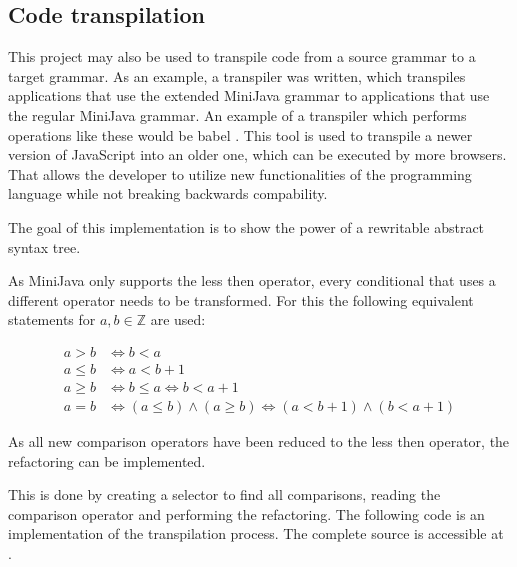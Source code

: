 
\subsection{Code transpilation}

This project may also be used to transpile code from a source grammar to a target grammar. 
As an example, a transpiler was written, which transpiles applications that use
the extended MiniJava grammar to applications that use the regular MiniJava grammar. 
An example of a transpiler which performs operations like these would be babel \cite{babeljs}. This tool is
used to transpile a newer version of JavaScript into an older one, which can be executed by more browsers. 
That allows the developer to utilize new functionalities of the programming language while not breaking backwards compability.

The goal of this implementation is to show the power of a rewritable abstract syntax tree. 

As MiniJava only supports the less then operator, every conditional that uses a different operator needs to be transformed.
For this the following equivalent statements for $a, b \in \mathbb{Z}$ are used:

\begin{align}
    a > b  &\Longleftrightarrow b < a\\
    a \leq b  &\Longleftrightarrow a < b + 1\\
    a \geq b  &\Longleftrightarrow b \leq a \Longleftrightarrow b < a + 1\\
    a = b  &\Longleftrightarrow (a \leq b) \land (a \geq b) \Longleftrightarrow (a < b + 1) \land (b < a+ 1)
\end{align}

As all new comparison operators have been reduced to the less then operator, the refactoring can be implemented.

This is done by creating a selector to find all comparisons, reading the comparison operator and performing the refactoring.
The following code is an implementation of the transpilation process. The complete source is accessible at \cite{extended_mjava_transformation}.

